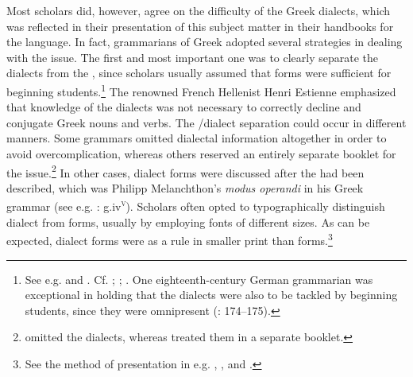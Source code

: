 Most scholars did, however, agree on the difficulty of the Greek dialects, which was reflected in their presentation of this subject matter in their handbooks for the language. In fact, grammarians of Greek adopted several strategies in dealing with the issue. The first and most important one was to clearly separate the dialects from the , since scholars usually assumed that  forms were sufficient for beginning students.\footnote{See e.g.  and \citet[223]{Tavoni1986}. Cf. \citet[aa.ii\textsc{\textsuperscript{v}}]{Glarean1524}; \citet[\textsc{a}.ii\textsc{\textsuperscript{v}}]{Metzler1529}; \citet[105]{Rollin1726}. One eighteenth-century German grammarian was exceptional in holding that the dialects were also to be tackled by beginning students, since they were omnipresent (\citealt{Trendelenburg1782}: 174–175).} The renowned French Hellenist Henri Estienne emphasized that knowledge of the dialects was not necessary to correctly decline and conjugate Greek nouns and verbs. The /dialect separation could occur in different manners. Some grammars omitted dialectal information altogether in order to avoid overcomplication, whereas others reserved an entirely separate booklet for the issue.\footnote{\citet[\textsc{b.}iv\textsc{\textsuperscript{r}}]{Caselius1560} omitted the dialects, whereas \citet[†.6\textsc{\textsuperscript{v}}–†.7\textsc{\textsuperscript{r}}]{Walper1589} treated them in a separate booklet.} In other cases, dialect forms were discussed after the  had been described, which was Philipp Melanchthon’s \textit{modus operandi} in his Greek grammar (see e.g. \citealt{Melanchthon1518}: g.iv\textsc{\textsuperscript{v}}). Scholars often opted to typographically distinguish dialect from  forms, usually by employing fonts of different sizes. As can be expected, dialect forms were as a rule in smaller print than  forms.\footnote{See the method of presentation in e.g. \citet{Gretser1593}, \citet{Anon.1613}, and \citet{Lancelot1655}.}

